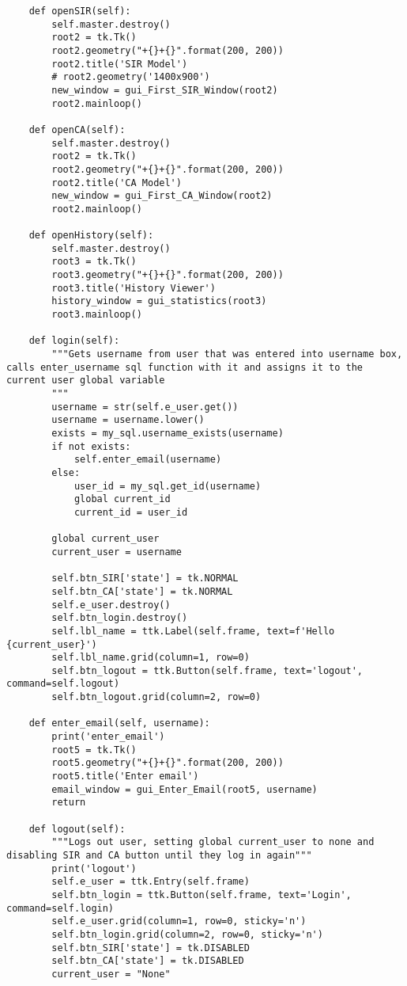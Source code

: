 \documentclass[11pt, a4paper]{article}
\begin{document}
\begin{lstlisting}
    def openSIR(self):
        self.master.destroy()
        root2 = tk.Tk()
        root2.geometry("+{}+{}".format(200, 200))
        root2.title('SIR Model')
        # root2.geometry('1400x900')
        new_window = gui_First_SIR_Window(root2)
        root2.mainloop()

    def openCA(self):
        self.master.destroy()
        root2 = tk.Tk()
        root2.geometry("+{}+{}".format(200, 200))
        root2.title('CA Model')
        new_window = gui_First_CA_Window(root2)
        root2.mainloop()

    def openHistory(self):
        self.master.destroy()
        root3 = tk.Tk()
        root3.geometry("+{}+{}".format(200, 200))
        root3.title('History Viewer')
        history_window = gui_statistics(root3)
        root3.mainloop()

    def login(self):
        """Gets username from user that was entered into username box, calls enter_username sql function with it and assigns it to the current user global variable
        """
        username = str(self.e_user.get())
        username = username.lower()
        exists = my_sql.username_exists(username)
        if not exists:
            self.enter_email(username)
        else:
            user_id = my_sql.get_id(username)
            global current_id
            current_id = user_id

        global current_user
        current_user = username

        self.btn_SIR['state'] = tk.NORMAL
        self.btn_CA['state'] = tk.NORMAL
        self.e_user.destroy()
        self.btn_login.destroy()
        self.lbl_name = ttk.Label(self.frame, text=f'Hello {current_user}')
        self.lbl_name.grid(column=1, row=0)
        self.btn_logout = ttk.Button(self.frame, text='logout', command=self.logout)
        self.btn_logout.grid(column=2, row=0)

    def enter_email(self, username):
        print('enter_email')
        root5 = tk.Tk()
        root5.geometry("+{}+{}".format(200, 200))
        root5.title('Enter email')
        email_window = gui_Enter_Email(root5, username)
        return

    def logout(self):
        """Logs out user, setting global current_user to none and disabling SIR and CA button until they log in again"""
        print('logout')
        self.e_user = ttk.Entry(self.frame)
        self.btn_login = ttk.Button(self.frame, text='Login', command=self.login)
        self.e_user.grid(column=1, row=0, sticky='n')
        self.btn_login.grid(column=2, row=0, sticky='n')
        self.btn_SIR['state'] = tk.DISABLED
        self.btn_CA['state'] = tk.DISABLED
        current_user = "None"



\end{lstlisting}
\end{document}

